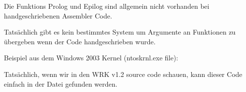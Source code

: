 \par Die Funktions Prolog und Epilog sind allgemein nicht vorhanden bei handgeschriebenen Assembler Code.

\par Tats\"achlich gibt es kein bestimmtes System um Argumente an Funktionen zu \"ubergeben wenn der Code handgeschrieben wurde. 

\par Beispiel aus dem Windows 2003 Kernel (ntoskrnl.exe file):



Tats\"achlich, wenn wir in den \ac{WRK} v1.2 source code schauen, kann dieser Code einfach in der Datei
 gefunden werden.
